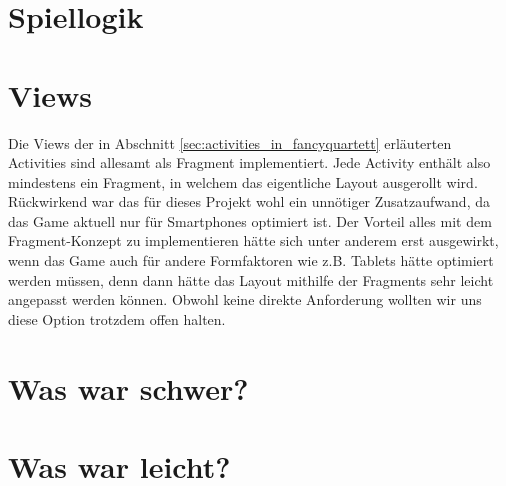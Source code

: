 \section{Spiellogik}


\section{Views}
Die Views der in Abschnitt \ref{sec:activities_in_fancyquartett} erläuterten Activities sind allesamt als Fragment implementiert. Jede Activity enthält also mindestens ein Fragment, in welchem das eigentliche Layout ausgerollt wird. Rückwirkend war das für dieses Projekt wohl ein unnötiger Zusatzaufwand, da das Game aktuell nur für Smartphones optimiert ist. Der Vorteil alles mit dem Fragment-Konzept zu implementieren hätte sich unter anderem erst ausgewirkt, wenn das Game auch für andere Formfaktoren wie z.B. Tablets hätte optimiert werden müssen, denn dann hätte das Layout mithilfe der Fragments sehr leicht angepasst werden können. Obwohl keine direkte Anforderung wollten wir uns diese Option trotzdem offen halten.
\section{Was war schwer?}


\section{Was war leicht?}




